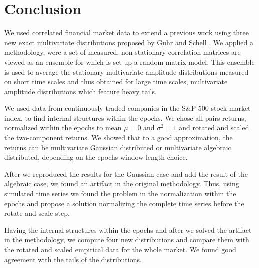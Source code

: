 \section{Conclusion}\label{sec:conclusion}

We used correlated financial market data to extend a previous work
\cite{non_stationarity_fin_guhr} using three new exact multivariate
distributions proposed by Guhr and Schell \cite{exact_distributions_guhr}.
We applied a methodology, were a set of measured, non-stationary correlation
matrices are viewed as an ensemble for which is set up a random matrix model.
This ensemble is used to average the stationary multivariate amplitude
distributions measured on short time scales and thus obtained for large time
scales, multivariate amplitude distributions which feature heavy tails.

We used data from continuously traded companies in the S\&P 500 stock market
index, to find internal structures within the epochs. We chose all pairs
returns, normalized within the epochs to mean $\mu = 0$ and $\sigma^{2} = 1$
and rotated and scaled the two-component returns. We showed that to a good
approximation, the returns can be multivariate Gaussian distributed or
multivariate algebraic distributed, depending on the epochs window length
choice.

After we reproduced the results for the Gaussian
\cite{non_stationarity_fin_guhr} case and add the result of the algebraic case,
we found an artifact in the original methodology. Thus, using simulated time
series we found the problem in the normalization within the epochs and propose
a solution normalizing the complete time series before the rotate and scale
step.

Having the internal structures within the epochs and after we solved the
artifact in the methodology, we compute four new distributions and compare them
with the rotated and scaled empirical data for the whole market. We found good
agreement with the tails of the distributions.